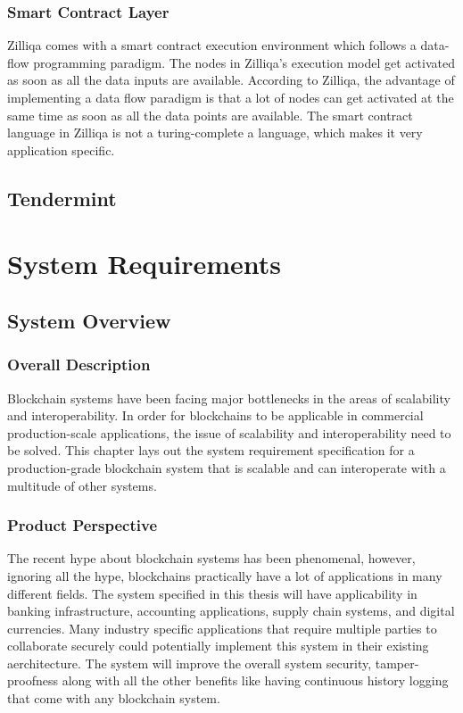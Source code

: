 \documentclass[a4paper,twoside,phd]{BYUPhys}
\begin{document}
\subsection{Smart Contract Layer}
Zilliqa comes with a smart contract execution environment which follows a data-flow programming paradigm. The nodes in Zilliqa's execution model get activated as soon as all the data inputs are available. According to Zilliqa, the advantage of implementing a data flow paradigm is that a lot of nodes can get activated at the same time as soon as all the data points are available. The smart contract language in Zilliqa is not a turing-complete a language, which makes it very application specific. 

\section{Tendermint}

\label{chap:LitReview}

\chapter{System Requirements}
\label{chap:singleuser}

\section{System Overview \label{sec:Intro-ChapUserSelec}}
\subsection{Overall Description}
Blockchain systems have been facing major bottlenecks in the areas of scalability and interoperability. In order for blockchains to be applicable in commercial production-scale applications, the issue of scalability and interoperability need to be solved. This chapter lays out the system requirement specification for a production-grade blockchain system that is scalable and can interoperate with a multitude of other systems.
\subsection{Product Perspective}
The recent hype about blockchain systems has been phenomenal, however, ignoring all the hype, blockchains practically have a lot of applications in many different fields. The system specified in this thesis will have applicability in banking infrastructure, accounting applications, supply chain systems, and digital currencies. Many industry specific applications that require multiple parties to collaborate securely could potentially implement this system in their existing aerchitecture. The system will improve the overall system security, tamper-proofness along with all the other benefits like having continuous history logging that come with any blockchain system.
\end{document}
